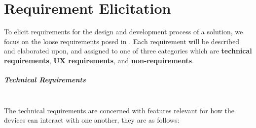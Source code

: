 \chapter{Requirement Elicitation}\label{cha:requirement_elicitation}
To elicit requirements for the design and development process of a solution, we focus on the loose requirements posed in .
Each requirement will be described and elaborated upon, and assigned to one of three categories which are \textbf{technical requirements}, \textbf{\ac{UX} requirements}, and \textbf{non-requirements}.

\paragraph{Technical Requirements} \hfill\\
The technical requirements are concerned with features relevant for how the devices can interact with one another, they are as follows:
